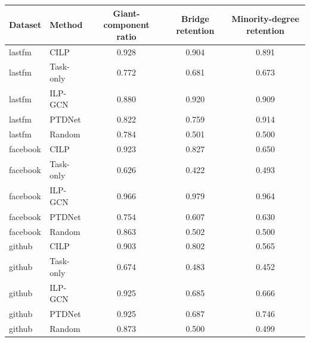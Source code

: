 \begin{tabular}{@{}llccc@{}}
\toprule
Dataset & Method & Giant-component ratio & Bridge retention & Minority-degree retention \\
\midrule
lastfm & CILP & 0.928 & 0.904 & 0.891 \\
lastfm & Task-only & 0.772 & 0.681 & 0.673 \\
lastfm & ILP-GCN & 0.880 & 0.920 & 0.909 \\
lastfm & PTDNet & 0.822 & 0.759 & 0.914 \\
lastfm & Random & 0.784 & 0.501 & 0.500 \\
facebook & CILP & 0.923 & 0.827 & 0.650 \\
facebook & Task-only & 0.626 & 0.422 & 0.493 \\
facebook & ILP-GCN & 0.966 & 0.979 & 0.964 \\
facebook & PTDNet & 0.754 & 0.607 & 0.630 \\
facebook & Random & 0.863 & 0.502 & 0.500 \\
github & CILP & 0.903 & 0.802 & 0.565 \\
github & Task-only & 0.674 & 0.483 & 0.452 \\
github & ILP-GCN & 0.925 & 0.685 & 0.666 \\
github & PTDNet & 0.925 & 0.687 & 0.746 \\
github & Random & 0.873 & 0.500 & 0.499 \\
\bottomrule
\end{tabular}
